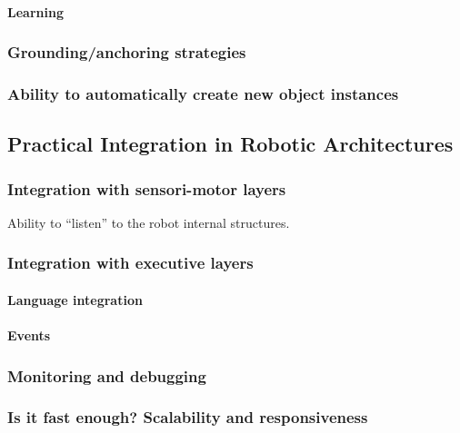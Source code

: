 \documentclass[a4paper, twocolumn]{article}
\begin{document}
\paragraph{Learning}

\subsubsection{Grounding/anchoring strategies}
\label{sect|grounding}

\subsubsection{Ability to automatically create new object instances}
\label{sect|new-instances}

\subsection{Practical Integration in Robotic Architectures}
\label{sect|integration-robot}

\subsubsection{Integration with sensori-motor layers}
\label{sect|integration-sensorimotor}

Ability to ``listen'' to the robot internal structures.

\subsubsection{Integration with executive layers}
\label{sect|integration-executive-layers}

\paragraph{Language integration}

\paragraph{Events}

\subsubsection{Monitoring and debugging}
\label{sect|debugging}

\subsubsection{Is it fast enough? Scalability and responsiveness}
\label{sect|scalability}
\end{document}
